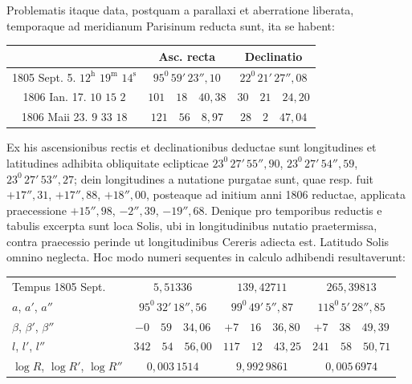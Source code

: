 Problematis itaque data, postquam a parallaxi et aberratione liberata,
temporaque ad meridianum Parisinum reducta sunt, ita se habent:
\begin{center}\begingroup\footnotesize\setlength{\tabcolsep}{3pt}\renewcommand{\arraystretch}{1.3}
\begin{tabular}{|c|c|c|}
\hline
 & Asc. recta & Declinatio \\
\hline
1805 Sept. 5. $12^{\mathrm h}$ $19^{\mathrm m}$ $14^{\mathrm s}$ & $95^0\,59'\,23''{,}10$ & $22^0\,21'\,27''{,}08$ \\
1806 Ian. 17. $10$ $15$ $2$ & $101\quad18\quad40{,}38$ & $30\quad21\quad24{,}20$ \\
1806 Maii 23. $9$ $33$ $18$ & $121\quad56\quad8{,}97$ & $28\quad2\quad47{,}04$ \\
\hline
\end{tabular}
\endgroup\end{center}

Ex his ascensionibus rectis et declinationibus deductae sunt longitudines
et latitudines adhibita obliquitate eclipticae $23^0\,27'\,55''{,}90$, $23^0\,27'\,54''{,}59$,
$23^0\,27'\,53''{,}27$; dein longitudines a nutatione purgatae sunt, quae resp. fuit
$+17''{,}31$, $+17''{,}88$, $+18''{,}00$, posteaque ad initium anni 1806 reductae, applicata praecessione $+15''{,}98$, $-2''{,}39$, $-19''{,}68$. Denique pro temporibus reductis
e tabulis excerpta sunt loca Solis, ubi in longitudinibus nutatio praetermissa,
contra praecessio perinde ut longitudinibus Cereris adiecta est. Latitudo Solis
omnino neglecta. Hoc modo numeri sequentes in calculo adhibendi resultaverunt:
\begin{center}\begingroup\footnotesize\setlength{\tabcolsep}{3pt}\renewcommand{\arraystretch}{1.3}
\begin{tabular}{l|c|c|c}
Tempus 1805 Sept. & $5{,}51336$ & $139{,}42711$ & $265{,}39813$ \\
$a$, $a'$, $a''$ & $95^0\,32'\,18''{,}56$ & $99^0\,49'\,5''{,}87$ & $118^0\,5'\,28''{,}85$ \\
$\beta$, $\beta'$, $\beta''$ & $-0\quad59\quad34{,}06$ & $+7\quad16\quad36{,}80$ & $+7\quad38\quad49{,}39$ \\
$l$, $l'$, $l''$ & $342\quad54\quad56{,}00$ & $117\quad12\quad43{,}25$ & $241\quad58\quad50{,}71$ \\
$\log R$, $\log R'$, $\log R''$ & $0{,}003\,1514$ & $9{,}992\,9861$ & $0{,}005\,6974$ \\
\end{tabular}
\endgroup\end{center}

